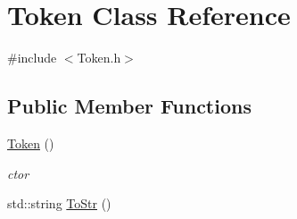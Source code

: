 \hypertarget{class_token}{\section{Token Class Reference}
\label{class_token}
}


{\ttfamily \#include $<$Token.\-h$>$}

\subsection*{Public Member Functions}
\begin{DoxyCompactItemize}
\item 
\hyperlink{class_token_aa3c5868ba4115f3189df6b2ac5b36f39}{Token} ()
\begin{DoxyCompactList}\small\item\em ctor \end{DoxyCompactList}\item 
std\-::string \hyperlink{class_token_aae7b73d9d7cdeaa0a05cc51fbf752e14}{To\-Str} ()
\end{DoxyCompactItemize}
